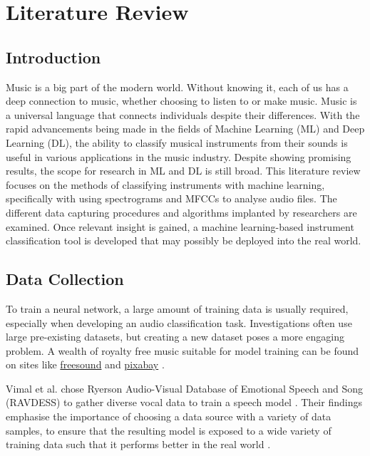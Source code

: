 \documentclass[class=report,11pt,crop=false]{standalone}
\begin{document}
\ifstandalone
\tableofcontents
\fi
\section{Literature Review \label{ch:literature}}

\subsection{Introduction}

Music is a big part of the modern world. Without knowing it, each of us has a deep connection to music, whether choosing to listen to or make music. Music is a universal language that connects individuals despite their differences. With the rapid advancements being made in the fields of Machine Learning (ML) and Deep Learning (DL), the ability to classify musical instruments from their sounds is useful in various applications in the music industry. Despite showing promising results, the scope for research in  ML and DL is still broad. This literature review focuses on the methods of classifying instruments with machine learning, specifically with using spectrograms and MFCCs to analyse audio files. The different data capturing procedures and algorithms implanted by researchers are examined. Once relevant insight is gained, a machine learning-based instrument classification tool is developed that may possibly be deployed into the real world. 

\subsection{Data Collection}

To train a neural network, a large amount of training data is usually required, especially when developing an audio classification task. Investigations often use large pre-existing datasets, but creating a new dataset poses a more engaging problem. A wealth of royalty free music suitable for model training can be found on sites like \href{https://freesound.org/}{freesound} \cite{freesound} and \href{https://pixabay.com/}{pixabay} \cite{pixabay}.

Vimal et al.  chose Ryerson Audio-Visual Database of Emotional Speech and Song (RAVDESS) to gather diverse vocal data to train a speech model \cite{Vimal_2021}. Their findings emphasise the importance of choosing a data source with a variety of data samples, to ensure that the resulting model is exposed to a wide variety of training data such that it performs better in the real world \cite{Vimal_2021}. 
\end{document}

